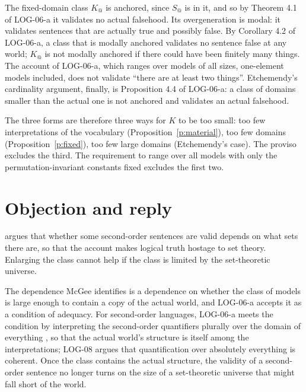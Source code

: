 \documentclass{situationist-preprint}
\begin{document}
The fixed-domain class $K_@$ is anchored, since $S_@$ is in it, and so by Theorem 4.1 of LOG-06-a it validates no actual falsehood. Its overgeneration is modal: it validates sentences that are actually true and possibly false. By Corollary 4.2 of LOG-06-a, a class that is modally anchored validates no sentence false at any world; $K_@$ is not modally anchored if there could have been finitely many things. The account of LOG-06-a, which ranges over models of all sizes, one-element models included, does not validate \enquote{there are at least two things}. Etchemendy's cardinality argument, finally, is Proposition 4.4 of LOG-06-a: a class of domains smaller than the actual one is not anchored and validates an actual falsehood.

The three forms are therefore three ways for $K$ to be too small: too few interpretations of the vocabulary (Proposition~\ref{p:material}), too few domains (Proposition~\ref{p:fixed}), too few large domains (Etchemendy's case). The proviso excludes the third. The requirement to range over all models with only the permutation-invariant constants fixed excludes the first two.

\section{Objection and reply}

\begin{objection}
\citet{McGee1992} argues that whether some second-order sentences are valid depends on what sets there are, so that the account makes logical truth hostage to set theory. Enlarging the class cannot help if the class is limited by the set-theoretic universe.
\end{objection}

\begin{reply}
The dependence McGee identifies is a dependence on whether the class of models is large enough to contain a copy of the actual world, and LOG-06-a accepts it as a condition of adequacy. For second-order languages, LOG-06-a meets the condition by interpreting the second-order quantifiers plurally over the domain of everything \citep{RayoUzquiano1999}, so that the actual world's structure is itself among the interpretations; LOG-08 argues that quantification over absolutely everything is coherent. Once the class contains the actual structure, the validity of a second-order sentence no longer turns on the size of a set-theoretic universe that might fall short of the world.
\end{reply}
\end{document}
